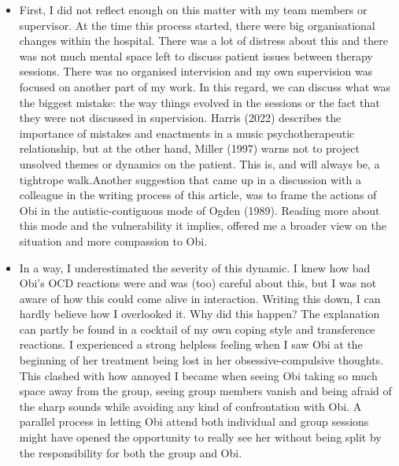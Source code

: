 \documentclass[authordate, empirical, issue]{jote-new-article}
\begin{document}
\begin{itemize}


  \item First, I did not reflect enough on this matter with my team members or supervisor. At the time this process started, there were big organisational changes within the hospital. There was a lot of distress about this and there was not much mental space left to discuss patient issues between therapy sessions. There was no organised intervision and my own supervision was focused on another part of my work. In this regard, we can discuss what was the biggest mistake: the way things evolved in the sessions or the fact that they were not discussed in supervision. Harris (2022) describes the importance of mistakes and enactments in a music psychotherapeutic relationship, but at the other hand, Miller (1997) warns not to project unsolved themes or dynamics on the patient. This is, and will always be, a tightrope walk.Another suggestion that came up in a discussion with a colleague in the writing process of this article, was to frame the actions of Obi in the autistic-contiguous mode of Ogden (1989). Reading more about this mode and the vulnerability it implies, offered me a broader view on the situation and more compassion to Obi.



  \item
        In a way, I underestimated the severity of this dynamic. I knew how bad Obi's OCD reactions were and was (too) careful about this, but I was not aware of how this could come alive in interaction. Writing this down, I can hardly believe how I overlooked it. Why did this happen? The explanation can partly be found in a cocktail of my own coping style and transference reactions. I experienced a strong helpless feeling when I saw Obi at the beginning of her treatment being lost in her obsessive-compulsive thoughts. This clashed with how annoyed I became when seeing Obi taking so much space away from the group, seeing group members vanish and being afraid of the sharp sounds while avoiding any kind of confrontation with Obi. A parallel process in letting Obi attend both individual and group sessions might have opened the opportunity to really see her without being split by the responsibility for both the group and Obi.




\end{itemize}
\end{document}
